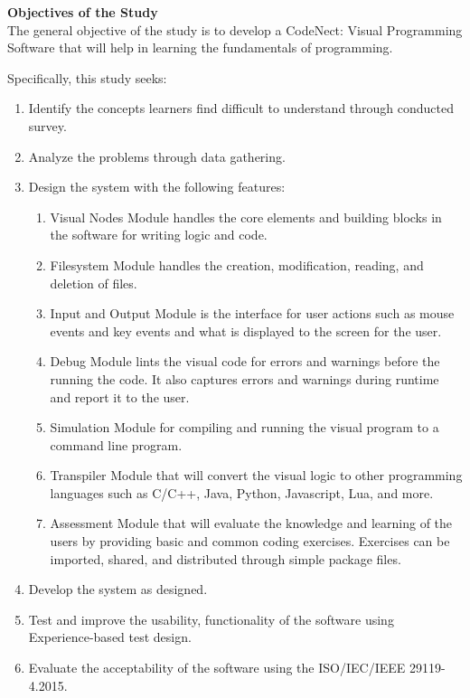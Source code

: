 \flushleft
\textbf{Objectives of the Study}\\
\justifying
\parx
The general objective of the study is to develop a CodeNect: Visual Programming
Software that will help in learning the fundamentals of programming.

\parx
Specifically, this study seeks:

\begin{enumerate}
	\item Identify the concepts learners find difficult to understand through conducted survey.
	\item Analyze the problems through data gathering.
	\item Design the system with the following features:
		\begin{enumerate}
			\item Visual Nodes Module handles the core elements and building blocks
				in the software for writing logic and code.
			\item Filesystem Module handles the creation, modification, reading, and
				deletion of files.
			\item Input and Output Module is the interface for user actions such as mouse
				events and key events and what is displayed to the screen for the user.
			\item Debug Module lints the visual code for errors and warnings before
				the running the code. It also captures errors and warnings during runtime
				and report it to the user.
			\item Simulation Module for compiling and running the visual program to
				a command line program.
			\item Transpiler Module that will convert the visual logic to other
				programming languages such as C/C++, Java, Python, Javascript, Lua, and
				more.
			\item Assessment Module that will evaluate the knowledge and learning of the
				users by providing basic and common coding exercises. Exercises can be
				imported, shared, and distributed through simple package files.
		\end{enumerate}

	\item Develop the system as designed.
	\item Test and improve the usability, functionality of the software using Experience-based test design.
	\item Evaluate the acceptability of the software using the ISO/IEC/IEEE 29119-4.2015. \\
\end{enumerate}
